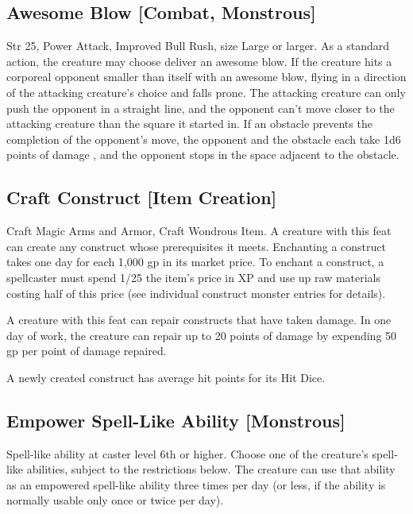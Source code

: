 \subsection{Awesome Blow [Combat, Monstrous]}
 Str 25, Power Attack, Improved Bull Rush, size Large or larger.
 As a standard action, the creature may choose  deliver an awesome blow. If the creature hits a corporeal opponent smaller than itself with an awesome blow,  flying  in a direction of the attacking creature's choice and falls prone. The attacking creature can only push the opponent in a straight line, and the opponent can't move closer to the attacking creature than the square it started in. If an obstacle prevents the completion of the opponent's move, the opponent and the obstacle each take 1d6 points of damage , and the opponent stops in the space adjacent to the obstacle.

\subsection{Craft Construct [Item Creation]}
 Craft Magic Arms and Armor, Craft Wondrous Item.
 A creature with this feat can create any construct whose prerequisites it meets. Enchanting a construct takes one day for each 1,000 gp in its market price. To enchant a construct, a spellcaster must spend 1/25 the item's price in XP and use up raw materials costing half of this price (see individual construct monster entries for details).

A creature with this feat can repair constructs that have taken damage. In one day of work, the creature can repair up to 20 points of damage by expending 50 gp per point of damage repaired.

A newly created construct has average hit points for its Hit Dice.

\subsection{Empower Spell-Like Ability [Monstrous]}
 Spell-like ability at caster level 6th or higher.
 Choose one of the creature's spell-like abilities, subject to the restrictions below. The creature can use that ability as an empowered spell-like ability three times per day (or less, if the ability is normally usable only once or twice per day).

